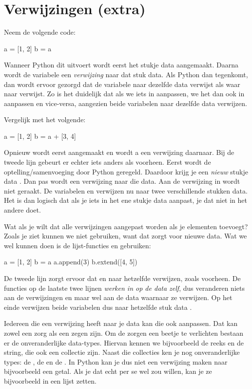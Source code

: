 \section{Verwijzingen (extra)}\label{sec:pointers}
  Neem de volgende code:
  \begin{python}
    a = [1, 2]
    b = a
  \end{python}
  Wanneer Python dit uitvoert wordt eerst het stukje data \py{[1, 2]}
  aangemaakt. Daarna wordt de variabele  een \emph{verwijzing} naar dat
  stuk data. Als Python dan  tegenkomt, dan wordt ervoor gezorgd dat
  de variabele  naar dezelfde data verwijst als waar  naar verwijst.
  Zo is het duidelijk dat als we iets in  aanpassen, we het dan ook in
   aanpassen en vice-versa, aangezien beide variabelen naar dezelfde data
  verwijzen.

  Vergelijk met het volgende:
  \begin{python}
    a = [1, 2]
    b = a + [3, 4]
  \end{python}
  Opnieuw wordt eerst \py{[1, 2]} aangemaakt en wordt a een verwijzing daarnaar.
  Bij de tweede lijn gebeurt er echter iets anders als voorheen. Eerst wordt de
  optelling/samenvoeging door Python geregeld. Daardoor krijg je een
  \emph{nieuw} stukje data \py{[1, 2, 3, 4]}. Dan pas wordt  een
  verwijzing naar die data. Aan de verwijzing in  wordt niet geraakt. De
  variabelen  en  verwijzen nu naar twee verschillende stukken data.
  Het is dan logisch dat als je iets in het ene stukje data aanpast, je dat niet
  in het andere doet.

  Wat als je wilt dat alle verwijzingen aangepast worden als je elementen
  toevoegt? Zoals je ziet kunnen we \py{+} niet gebruiken, want dat zorgt voor
  nieuwe data. Wat we wel kunnen doen is de lijst-functies  en
   gebruiken:
  \begin{python}
    a = [1, 2]
    b = a
    a.append(3)
    b.extend([4, 5])
  \end{python}
  De tweede lijn zorgt ervoor dat  en  naar hetzelfde verwijzen,
  zoals voorheen. De functies op de laatste twee lijnen \emph{werken in op de
    data zelf}, dus veranderen niets aan de verwijzingen  en  maar
  wel aan de data waarnaar ze verwijzen. Op het einde verwijzen beide variabelen
  dus naar hetzelfde stuk data \py{[1, 2, 3, 4, 5]}.

  Iedereen die een verwijzing heeft naar je data kan die ook aanpassen. Dat kan
  zowel een zorg als een zegen zijn. Om de zorgen een beetje te verlichten
  bestaan er de onveranderlijke data-types. Hiervan kennen we bijvoorbeeld de
  reeks en de string, die ook een collectie zijn. Naast die collecties
  ken je nog onveranderlijke types: de , de  en de .
  In Python kan je dus niet een verwijzing maken naar bijvoorbeeld een getal.
  Als je dat echt per se wel zou willen, kan je ze bijvoorbeeld in een lijst
  zetten.

